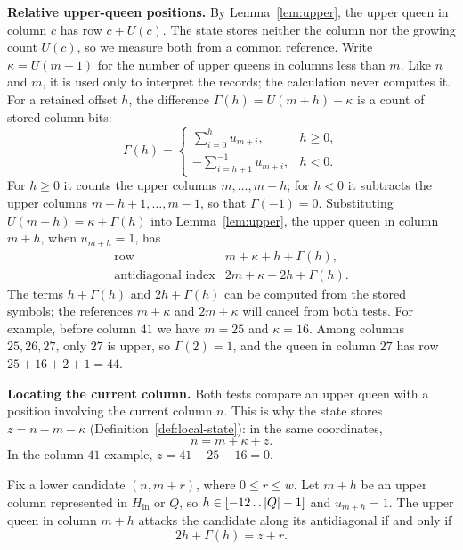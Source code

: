 \medskip\noindent
\textbf{Relative upper-queen positions.}
By Lemma~\ref{lem:upper}, the upper queen in column $c$ has row
$c+U(c)$. The state stores neither the column nor the growing count
$U(c)$, so we measure both from a common reference. Write
$\kappa=U(m-1)$ for the number of upper queens in columns less than $m$.
Like $n$ and $m$, it is used only to interpret the records; the
calculation never computes it. For a retained offset $h$, the
difference $\Gamma(h)=U(m+h)-\kappa$ is a count of stored
column bits:
\begin{equation}\label{eq:C}
 \Gamma(h)=
 \begin{cases}
  \displaystyle\sum_{i=0}^{h}u_{m+i},&h\ge0,\\[4pt]
  \displaystyle-\sum_{i=h+1}^{-1}u_{m+i},&h<0.
 \end{cases}
\end{equation}
For $h\ge0$ it counts the upper columns $m,\dots,m+h$; for $h<0$ it
subtracts the upper columns $m+h+1,\dots,m-1$, so that
$\Gamma(-1)=0$. Substituting $U(m+h)=\kappa+\Gamma(h)$ into
Lemma~\ref{lem:upper}, the upper queen in column $m+h$, when
$u_{m+h}=1$, has
\begin{equation}\label{eq:source-offsets}
 \begin{array}{ll}
 \text{row}&m+\kappa+h+\Gamma(h),\\
 \text{antidiagonal index}&2m+\kappa+2h+\Gamma(h).
 \end{array}
\end{equation}
The terms $h+\Gamma(h)$ and $2h+\Gamma(h)$ can be computed from the
stored symbols; the references $m+\kappa$ and $2m+\kappa$ will cancel
from both tests. For example, before column $41$ we have $m=25$ and
$\kappa=16$. Among columns $25,26,27$, only $27$ is upper, so
$\Gamma(2)=1$, and the queen in column $27$ has row
$25+16+2+1=44$.

\medskip\noindent
\textbf{Locating the current column.}
Both tests compare an upper queen with a position involving the
current column $n$. This is why the state stores $z=n-m-\kappa$
(Definition~\ref{def:local-state}): in the same coordinates,
\begin{equation}\label{eq:relative}
 n=m+\kappa+z.
\end{equation}
In the column-$41$ example, $z=41-25-16=0$.

\begin{proposition}\label{prop:upper-antidiagonal-test}
Fix a lower candidate $(n,m+r)$, where $0\le r\le w$.
Let $m+h$ be an upper column represented in $H_{\mathrm{in}}$
or $Q$, so $h\in[-12\mathinner{\ldotp\ldotp} |Q|-1]$ and $u_{m+h}=1$.
The upper queen in column $m+h$ attacks the candidate along
its antidiagonal if and only if
\begin{equation}\label{eq:upper-sum}
 2h+\Gamma(h)=z+r.
\end{equation}
\end{proposition}

